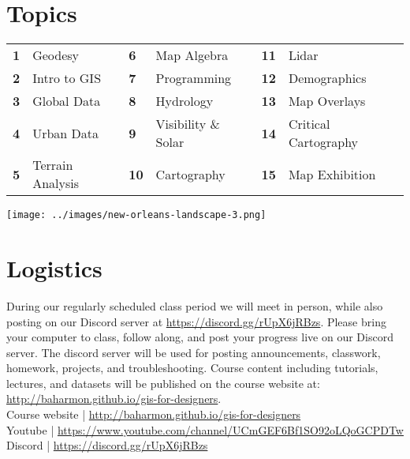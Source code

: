 \documentclass[11pt,article,oneside]{memoir}
\begin{document}
\section{Topics}

\begin{table}[H]
\begin{tabular}{l l @{\hskip 0.5cm} l l @{\hskip 0.5cm} l l}
\small
\textbf{1} & Geodesy & \textbf{6} & Map Algebra & \textbf{11} & Lidar\\
\textbf{2} & Intro to GIS & \textbf{7} & Programming & \textbf{12} & Demographics\\
\textbf{3} & Global Data & \textbf{8} & Hydrology & \textbf{13} & Map Overlays\\
\textbf{4} & Urban Data & \textbf{9} & Visibility \& Solar & \textbf{14} & Critical Cartography\\
\textbf{5} & Terrain Analysis & \textbf{10} & Cartography & \textbf{15} & Map Exhibition\\
\end{tabular}
\end{table}

\vspace*{1em}

\texttt{[image: ../images/new-orleans-landscape-3.png]}

\clearpage

\section{Logistics}

During our regularly scheduled class period
we will meet in person, while also posting
on our Discord server at \url{https://discord.gg/rUpX6jRBzs}. %
Please bring your computer to class, follow along, 
and post your progress live on our Discord server. 
The discord server will be used for posting
announcements, classwork, homework, projects, and troubleshooting. 
Course content including tutorials, lectures, and datasets
will be published on the course website at:
\url{http://baharmon.github.io/gis-for-designers}.\\

\noindent
Course website | \url{http://baharmon.github.io/gis-for-designers}\\
Youtube | \url{https://www.youtube.com/channel/UCmGEF6Bf1SO92oLQoGCPDTw}\\
Discord | \url{https://discord.gg/rUpX6jRBzs}\\ %
\end{document}
